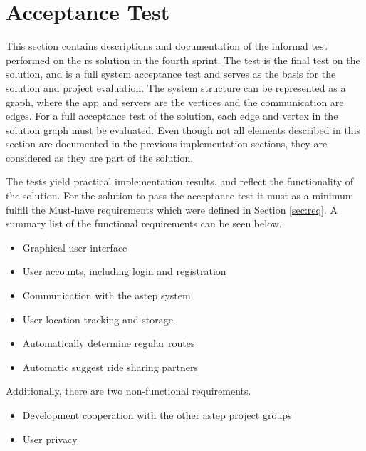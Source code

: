 
\iffalse
\section{Acceptance Test}
This section contains descriptions and documentation of the informal test performed on the \gls{rs} solution in the fourth sprint.
The test is the final test on the solution, and is a full system acceptance test and serves as the basis for the solution and project evaluation.
The system structure can be represented as a graph, where the app and servers are the vertices and the communication are edges. 
For a full acceptance test of the solution, each edge and vertex in the solution graph must be evaluated. 
Even though not all elements described in this section are documented in the previous implementation sections, they are considered as they are part of the solution.

The tests yield practical implementation results, and reflect the functionality of the solution.
For the solution to pass the acceptance test it must as a minimum fulfill the Must-have requirements which were defined in Section \ref{sec:req}.
A summary list of the functional requirements can be seen below.
\begin{itemize}
	\item Graphical user interface
	\item User accounts, including login and registration
	\item Communication with the \gls{astep} system
	\item User location tracking and storage
	\item Automatically determine regular routes
	\item Automatic suggest ride sharing partners
\end{itemize}

Additionally, there are two non-functional requirements.
\begin{itemize}
	\item Development cooperation with the other \gls{astep} project groups
	\item User privacy
\end{itemize}

